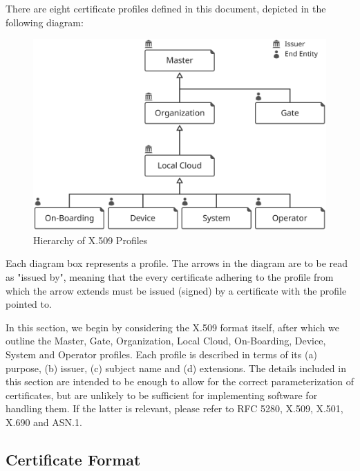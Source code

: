 %
%

There are eight certificate profiles defined in this document, depicted in the following diagram:

\begin{figure}[ht!]
  \centering
  \includegraphics[scale=0.8]{figures/profile-hierarchy}
  \caption{
    Hierarchy of X.509 Profiles
  }
  \label{fig:profile-hierarchy}
\end{figure}

Each diagram box represents a profile.
The arrows in the diagram are to be read as "issued by", meaning that the every certificate adhering to the profile from which the arrow extends must be issued (signed) by a certificate with the profile pointed to.

In this section, we begin by considering the X.509 format itself, after which we outline the Master, Gate, Organization, Local Cloud, On-Boarding, Device, System and Operator profiles.
Each profile is described in terms of its (a) purpose, (b) issuer, (c) subject name and (d) extensions.
The details included in this section are intended to be enough to allow for the correct parameterization of certificates, but are unlikely to be sufficient for implementing software for handling them.
If the latter is relevant, please refer to RFC 5280, X.509, X.501, X.690 and ASN.1.

\subsection{Certificate Format}

